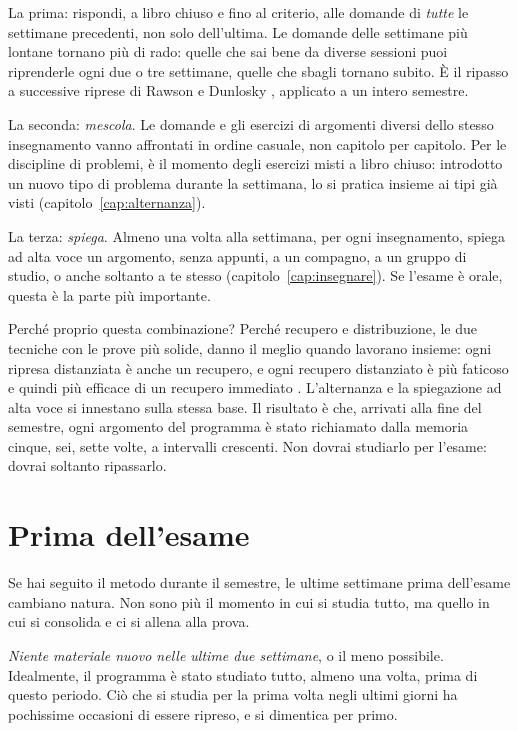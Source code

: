 La prima: rispondi, a libro chiuso e fino al criterio, alle domande di
\emph{tutte} le settimane precedenti, non solo dell'ultima. Le domande
delle settimane più lontane tornano più di rado: quelle che sai bene
da diverse sessioni puoi riprenderle ogni due o tre settimane, quelle
che sbagli tornano subito. È il ripasso a successive riprese di Rawson
e Dunlosky \parencite{rawson2013}, applicato a un intero semestre.

La seconda: \emph{mescola}. Le domande e gli esercizi di argomenti
diversi dello stesso insegnamento vanno affrontati in ordine casuale,
non capitolo per capitolo. Per le discipline di problemi, è il momento
degli esercizi misti a libro chiuso: introdotto un nuovo tipo di
problema durante la settimana, lo si pratica insieme ai tipi già visti
(capitolo~\ref{cap:alternanza}).

La terza: \emph{spiega}. Almeno una volta alla settimana, per ogni
insegnamento, spiega ad alta voce un argomento, senza appunti, a un
compagno, a un gruppo di studio, o anche soltanto a te stesso
(capitolo~\ref{cap:insegnare}). Se l'esame è orale, questa è la parte
più importante.

Perché proprio questa combinazione? Perché recupero e distribuzione,
le due tecniche con le prove più solide, danno il meglio quando lavorano
insieme: ogni ripresa distanziata è anche un recupero, e ogni recupero
distanziato è più faticoso e quindi più efficace di un recupero
immediato \parencite{carpenter2022}. L'alternanza e la spiegazione ad
alta voce si innestano sulla stessa base. Il risultato è che, arrivati
alla fine del semestre, ogni argomento del programma è stato richiamato
dalla memoria cinque, sei, sette volte, a intervalli crescenti. Non
dovrai studiarlo per l'esame: dovrai soltanto ripassarlo.

\section{Prima dell'esame}

Se hai seguito il metodo durante il semestre, le ultime settimane prima
dell'esame cambiano natura. Non sono più il momento in cui si studia
tutto, ma quello in cui si consolida e ci si allena alla prova.

\emph{Niente materiale nuovo nelle ultime due settimane}, o il meno
possibile. Idealmente, il programma è stato studiato tutto, almeno una
volta, prima di questo periodo. Ciò che si studia per la prima volta
negli ultimi giorni ha pochissime occasioni di essere ripreso, e si
dimentica per primo.

